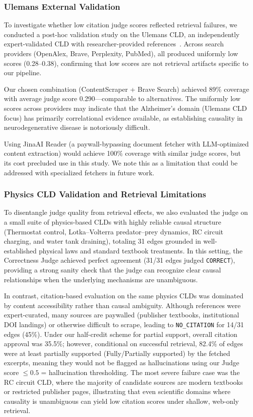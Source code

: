\subsubsection{Ulemans External Validation}

To investigate whether low citation judge scores reflected retrieval failures, we conducted a post-hoc validation study on the Ulemans CLD, an independently expert-validated CLD with researcher-provided references~\citep{uleman2021mapping}. Across search providers (OpenAlex, Brave, Perplexity, PubMed), all produced uniformly low scores (0.28--0.38), confirming that low scores are not retrieval artifacts specific to our pipeline.

Our chosen combination (ContentScraper + Brave Search) achieved 89\% coverage with average judge score 0.290---comparable to alternatives. The uniformly low scores across providers may indicate that the Alzheimer's domain (Ulemans CLD focus) has primarily correlational evidence available, as establishing causality in neurodegenerative disease is notoriously difficult.

Using JinaAI Reader (a paywall-bypassing document fetcher with LLM-optimized content extraction) would achieve 100\% coverage with similar judge scores, but its cost precluded use in this study. We note this as a limitation that could be addressed with specialized fetchers in future work.

\subsubsection{Physics CLD Validation and Retrieval Limitations}

To disentangle judge quality from retrieval effects, we also evaluated the judge on a small suite of physics-based CLDs with highly reliable causal structure (Thermostat control, Lotka--Volterra predator--prey dynamics, RC circuit charging, and water tank draining), totaling 31 edges grounded in well-established physical laws and standard textbook treatments. In this setting, the Correctness Judge achieved perfect agreement (31/31 edges judged \texttt{CORRECT}), providing a strong sanity check that the judge can recognize clear causal relationships when the underlying mechanisms are unambiguous.

In contrast, citation-based evaluation on the same physics CLDs was dominated by content accessibility rather than causal ambiguity. Although references were expert-curated, many sources are paywalled (publisher textbooks, institutional DOI landings) or otherwise difficult to scrape, leading to \texttt{NO\_CITATION} for 14/31 edges (45\%). Under our half-credit scheme for partial support, overall citation approval was 35.5\%; however, conditional on successful retrieval, 82.4\% of edges were at least partially supported (Fully/Partially supported) by the fetched excerpts, meaning they would not be flagged as hallucinations using our Judge score $\leq 0.5$ = hallucination thresholding. The most severe failure case was the RC circuit CLD, where the majority of candidate sources are modern textbooks or restricted publisher pages, illustrating that even scientific domains where causality is unambiguous can yield low citation scores under shallow, web-only retrieval.

